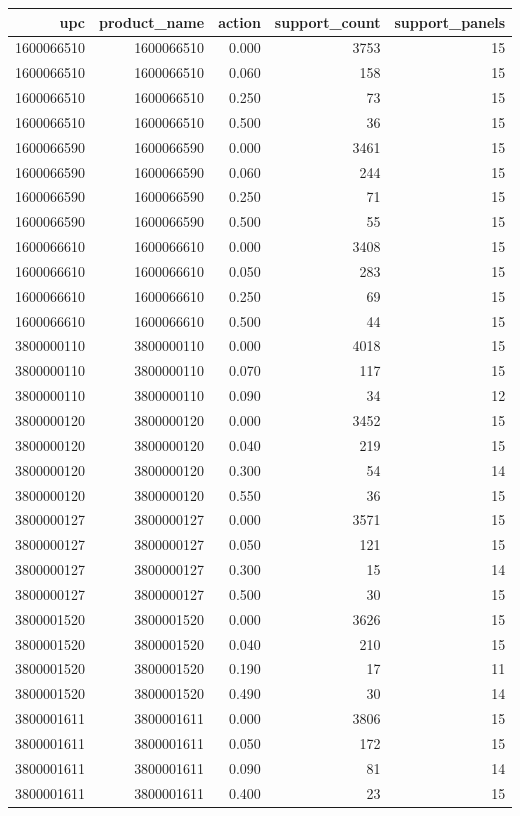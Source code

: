 \begin{tabular}{rrrrr}
\toprule
upc & product_name & action & support_count & support_panels \\
\midrule
1600066510 & 1600066510 & 0.000 & 3753 & 15 \\
1600066510 & 1600066510 & 0.060 & 158 & 15 \\
1600066510 & 1600066510 & 0.250 & 73 & 15 \\
1600066510 & 1600066510 & 0.500 & 36 & 15 \\
1600066590 & 1600066590 & 0.000 & 3461 & 15 \\
1600066590 & 1600066590 & 0.060 & 244 & 15 \\
1600066590 & 1600066590 & 0.250 & 71 & 15 \\
1600066590 & 1600066590 & 0.500 & 55 & 15 \\
1600066610 & 1600066610 & 0.000 & 3408 & 15 \\
1600066610 & 1600066610 & 0.050 & 283 & 15 \\
1600066610 & 1600066610 & 0.250 & 69 & 15 \\
1600066610 & 1600066610 & 0.500 & 44 & 15 \\
3800000110 & 3800000110 & 0.000 & 4018 & 15 \\
3800000110 & 3800000110 & 0.070 & 117 & 15 \\
3800000110 & 3800000110 & 0.090 & 34 & 12 \\
3800000120 & 3800000120 & 0.000 & 3452 & 15 \\
3800000120 & 3800000120 & 0.040 & 219 & 15 \\
3800000120 & 3800000120 & 0.300 & 54 & 14 \\
3800000120 & 3800000120 & 0.550 & 36 & 15 \\
3800000127 & 3800000127 & 0.000 & 3571 & 15 \\
3800000127 & 3800000127 & 0.050 & 121 & 15 \\
3800000127 & 3800000127 & 0.300 & 15 & 14 \\
3800000127 & 3800000127 & 0.500 & 30 & 15 \\
3800001520 & 3800001520 & 0.000 & 3626 & 15 \\
3800001520 & 3800001520 & 0.040 & 210 & 15 \\
3800001520 & 3800001520 & 0.190 & 17 & 11 \\
3800001520 & 3800001520 & 0.490 & 30 & 14 \\
3800001611 & 3800001611 & 0.000 & 3806 & 15 \\
3800001611 & 3800001611 & 0.050 & 172 & 15 \\
3800001611 & 3800001611 & 0.090 & 81 & 14 \\
3800001611 & 3800001611 & 0.400 & 23 & 15 \\
\bottomrule
\end{tabular}
